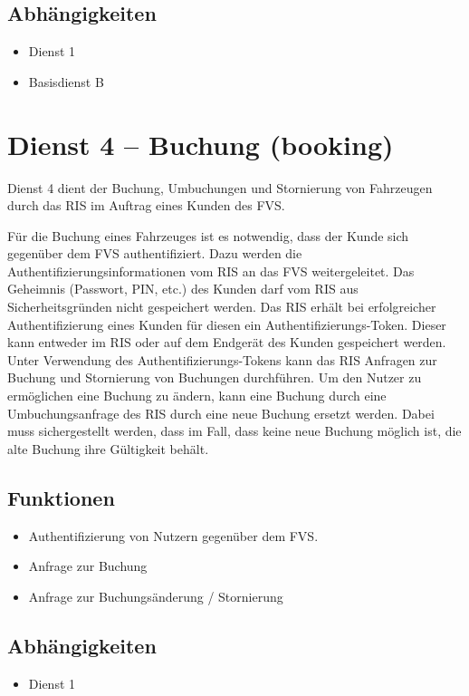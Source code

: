 \subsection*{Abhängigkeiten}
\begin{itemize}
\item Dienst 1
\item Basisdienst B
\end{itemize}


\section{Dienst 4 -- Buchung (booking)}
Dienst 4 dient der Buchung, Umbuchungen und Stornierung von Fahrzeugen durch das RIS im Auftrag eines Kunden des FVS.

Für die Buchung eines Fahrzeuges ist es notwendig, dass der Kunde sich gegenüber dem FVS authentifiziert. Dazu werden die Authentifizierungsinformationen vom RIS an das FVS weitergeleitet. Das Geheimnis (Passwort, PIN, etc.) des Kunden darf vom RIS aus Sicherheitsgründen nicht gespeichert werden. Das RIS erhält bei erfolgreicher Authentifizierung eines Kunden für diesen ein Authentifizierungs-Token. Dieser kann entweder im RIS oder auf dem Endgerät des Kunden gespeichert werden. Unter Verwendung des Authentifizierungs-Tokens kann das RIS Anfragen zur Buchung und Stornierung von Buchungen durchführen. 
Um den Nutzer zu ermöglichen eine Buchung zu ändern, kann eine Buchung durch eine Umbuchungsanfrage des RIS durch eine neue Buchung ersetzt werden. Dabei muss sichergestellt werden, dass im Fall, dass keine neue Buchung möglich ist, die alte Buchung ihre Gültigkeit behält.

\subsection*{Funktionen}
\begin{itemize}
\item Authentifizierung von Nutzern gegenüber dem FVS.
\item Anfrage zur Buchung
\item Anfrage zur Buchungsänderung / Stornierung
\end{itemize}

\subsection*{Abhängigkeiten}
\begin{itemize}
\item Dienst 1
\end{itemize}

